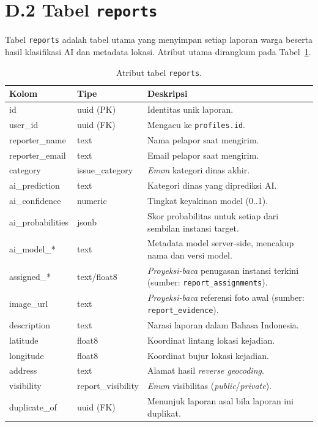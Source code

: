 \section*{D.2 Tabel \texttt{reports}}

Tabel \texttt{reports} adalah tabel utama yang menyimpan setiap laporan warga beserta hasil klasifikasi AI dan metadata lokasi. Atribut utama dirangkum pada Tabel~\ref{tab:reports}.

\begin{table}[htbp]
\centering
\caption{Atribut tabel \texttt{reports}.}
\label{tab:reports}
\small
\begin{tabular}{p{3.4cm} p{2.6cm} p{6.5cm}}
\toprule
\textbf{Kolom} & \textbf{Tipe} & \textbf{Deskripsi} \\
\midrule
id & uuid (PK) & Identitas unik laporan. \\
user\_id & uuid (FK) & Mengacu ke \texttt{profiles.id}. \\
reporter\_name & text & Nama pelapor saat mengirim. \\
reporter\_email & text & Email pelapor saat mengirim. \\
category & issue\_category & \textit{Enum} kategori dinas akhir. \\
ai\_prediction & text & Kategori dinas yang diprediksi AI. \\
ai\_confidence & numeric & Tingkat keyakinan model (0..1). \\
ai\_probabilities & jsonb & Skor probabilitas untuk setiap dari sembilan instansi target. \\
ai\_model\_* & text & Metadata model server-side, mencakup nama dan versi model. \\
assigned\_* & text/float8 & \textit{Proyeksi-baca} penugasan instansi terkini (sumber: \texttt{report\_assignments}). \\
image\_url & text & \textit{Proyeksi-baca} referensi foto awal (sumber: \texttt{report\_evidence}). \\
description & text & Narasi laporan dalam Bahasa Indonesia. \\
latitude & float8 & Koordinat lintang lokasi kejadian. \\
longitude & float8 & Koordinat bujur lokasi kejadian. \\
address & text & Alamat hasil \textit{reverse geocoding}. \\
visibility & report\_visibility & \textit{Enum} visibilitas (\textit{public}/\textit{private}). \\
duplicate\_of & uuid (FK) & Menunjuk laporan asal bila laporan ini duplikat. \\

\end{tabular}
\end{table}
